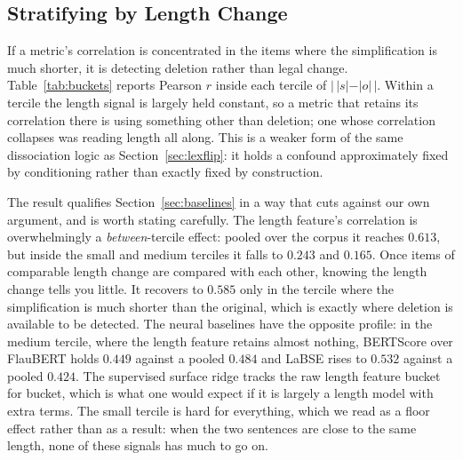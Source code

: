 \documentclass{BVP_JCLLT}
\begin{document}
\subsection{Stratifying by Length Change}\label{sec:buckets}

If a metric's correlation is concentrated in the items where the simplification
is much shorter, it is detecting deletion rather than legal change.
Table~\ref{tab:buckets} reports Pearson $r$ inside each tercile of
$|\,|s|-|o|\,|$. Within a tercile the length signal is largely held constant, so
a metric that retains its correlation there is using something other than
deletion; one whose correlation collapses was reading length all along. This is
a weaker form of the same dissociation logic as Section~\ref{sec:lexflip}: it
holds a confound approximately fixed by conditioning rather than exactly fixed
by construction.

\begin{table}
\centering
\caption{Correlation with the human label \emph{within} terciles of the absolute
length change, pooling test predictions over seeds. Restricting to a tercile
removes most of the length variance; a metric that measures legal meaning should
degrade far less than one that measures deletion.}\label{tab:buckets}
\small

\end{table}

The result qualifies Section~\ref{sec:baselines} in a way that cuts against our
own argument, and is worth stating carefully. The length feature's correlation
is overwhelmingly a \emph{between}-tercile effect: pooled over the corpus it
reaches $0.613$, but inside the small and medium terciles it falls to $0.243$
and $0.165$. Once items of comparable length change are compared with each
other, knowing the length change tells you little. It recovers to $0.585$ only
in the tercile where the simplification is much shorter than the original, which
is exactly where deletion is available to be detected. The neural baselines have
the opposite profile: in the medium tercile, where the length feature retains
almost nothing, BERTScore over FlauBERT holds $0.449$ against a pooled $0.484$
and LaBSE rises to $0.532$ against a pooled $0.424$. The supervised surface ridge
tracks the raw length feature bucket for bucket, which is what one would expect
if it is largely a length model with extra terms. The small tercile is hard for
everything, which we read as a floor effect rather than as a result: when the two
sentences are close to the same length, none of these signals has much to go on.
\end{document}
